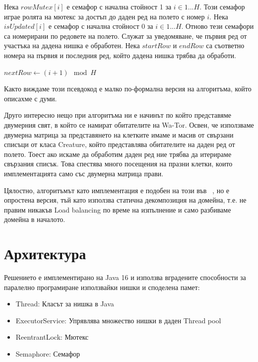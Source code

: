 \documentclass[12pt]{article}
\begin{document}
Нека $rowMutex[i]$ е семафор с начална стойност 1 за $i \in 1...H$.
Този семафор играе ролята на мютекс за достъп до даден ред на полето с номер $i$.
Нека $isUpdated[i]$ е семафор с начална стойност 0 за $i \in 1...H$.
Отново тези семафори са номерирани по редовете на полето. Служат за уведомяване,
че първия ред от участъка на дадена нишка е обработен.
Нека $startRow$ и $endRow$ са съответно номера на първия и последния ред,
който дадена нишка трябва да обработи.
\medbreak
\begin{algorithmic}
	\State $nextRow\gets (i + 1) \mod H$
		\State {}
		\State {}
		\State {}
	\EndIf

	\State {}

		\State {}
		\State {}
		\State {}
	\EndIf
\EndFor
\end{algorithmic}
\medbreak
Както виждаме този псевдокод е малко по-формална версия на алгоритъма, който описахме с думи.

Друго интересно нещо при алгоритъма ни е начинът по който представяме двумерния свят, в който се намират
обитателите на Wa-Tor. Освен, че използваме двумерна матрица за представянето на клетките
имаме и масив от свързани списъци от класа Creature, който представлява обитателите на даден
ред от полето. Тоест ако искаме да обработим даден ред ние трябва да итерираме свързания списък.
Това спестява много посещения на празни клетки, които имплементацията само със двумерна матрица прави.

Цялостно, алгоритъмът като имплементация е подобен на този във ~\cite{bounded_neighbours}, но е опростена
версия, тъй като използва статична декомпозиция на домейна, т.е. не правим никакъв Load balancing
по време на изпълнение и само разбиваме домейна в началото.

\newpage

\section{Архитектура}
Решението е имплементирано на Java 16 и използва вградените способности за паралелно програмиране
използвайки нишки и споделена памет:
\begin{itemize}
	\item Thread: Класът за нишка в Java
	\item ExecutorService: Упрявлява множество нишки в даден Thread pool
	\item ReentrantLock: Мютекс
	\item Semaphore: Семафор
\end{itemize}
\end{document}
